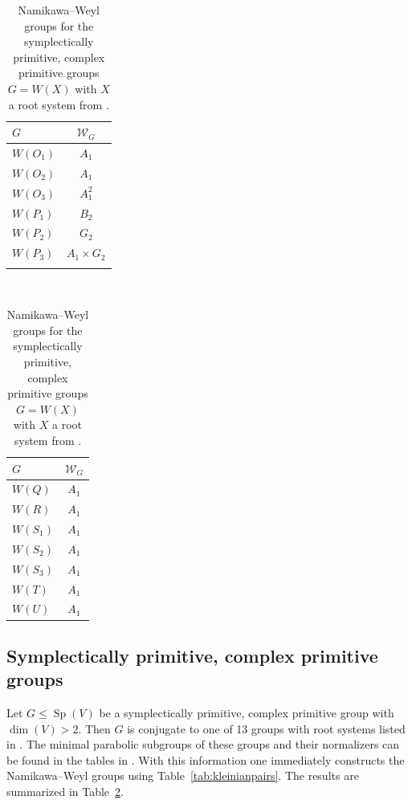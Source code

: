 \documentclass[a4paper]{amsart}
\theoremstyle{plain}
\theoremstyle{definition}
\theoremstyle{remark}
\DeclareMathOperator{\Sp}{Sp}
\begin{document}
\begin{table}
  \caption{Namikawa--Weyl groups for the symplectically primitive, complex primitive groups \(G = W(X)\) with \(X\) a root system from \cite[Table~II]{Coh80}.}
  \label{tab:excep}
  \begin{tabular}{|l|c|}
    \(G\) & \(\mathcal W_G\) \\
    \hline
    \(W(O_1)\) & \(A_1\) \\
    \(W(O_2)\) & \(A_1\) \\
    \(W(O_3)\) & \(A_1^2\) \\
    \(W(P_1)\) & \(B_2\) \\
    \(W(P_2)\) & \(G_2\) \\
    \(W(P_3)\) & \(A_1 \times G_2\) \\
    &
  \end{tabular}~
  \begin{tabular}{|l|c|}
    \(G\) & \(\mathcal W_G\) \\
    \hline
    \(W(Q)\) & \(A_1\) \\
    \(W(R)\) & \(A_1\) \\
    \(W(S_1)\) & \(A_1\) \\
    \(W(S_2)\) & \(A_1\) \\
    \(W(S_3)\) & \(A_1\) \\
    \(W(T)\) & \(A_1\) \\
    \(W(U)\) & \(A_1\)
  \end{tabular}
\end{table}

\subsection{Symplectically primitive, complex primitive groups}
Let \(G\leqslant \Sp(V)\) be a symplectically primitive, complex primitive group with \(\dim(V) > 2\).
Then \(G\) is conjugate to one of 13 groups with root systems listed in \cite[Table~II]{Coh80}.
The minimal parabolic subgroups of these groups and their normalizers can be found in the tables in \cite[Sect.~5.2]{RS26}.
With this information one immediately constructs the Namikawa--Weyl groups using Table~\ref{tab:kleinianpairs}. The results are summarized in Table~\ref{tab:excep}.
\end{document}
